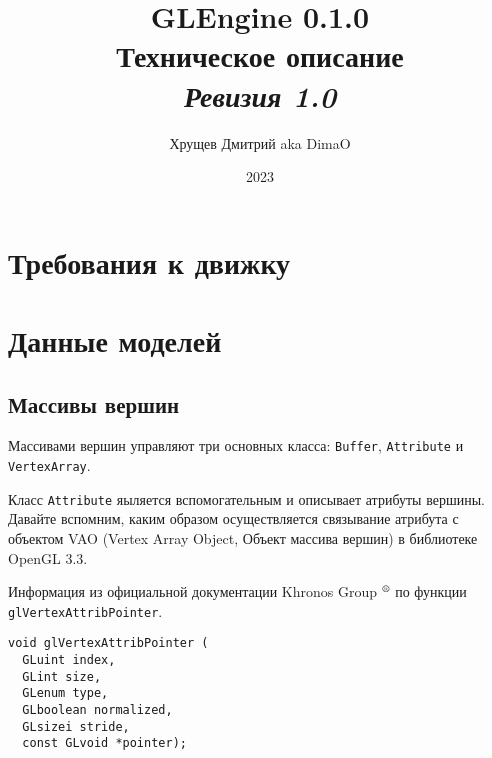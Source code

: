 \documentclass[a4paper, 12pt]{article}
\title{GLEngine 0.1.0 \\ \small{Техническое описание} \\
\textit{\small Ревизия 1.0}}
\author{Хрущев Дмитрий aka DimaO}
\date{2023}
\begin{document}
\maketitle
\newpage
\tableofcontents
\newpage
\section{Требования к движку}
\section{Данные моделей}
\subsection{Массивы вершин}
Массивами вершин управляют три основных класса: \texttt{Buffer},
\texttt{Attribute} и \texttt{VertexArray}.

Класс \texttt{Attribute} яыляется вспомогательным и описывает атрибуты вершины.
Давайте вспомним, каким образом осуществляется связывание атрибута с объектом
VAO (Vertex Array Object, Объект массива вершин) в библиотеке OpenGL 3.3.

Информация из официальной документации Khronos Group$~^\text{\textregistered}$
по функции \texttt{glVertexAttribPointer}.

\begin{verbatim}
void glVertexAttribPointer (
  GLuint index,
  GLint size,
  GLenum type,
  GLboolean normalized,
  GLsizei stride,
  const GLvoid *pointer);
\end{verbatim}
\end{document}
